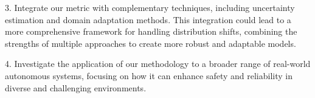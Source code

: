 3. Integrate our metric with complementary techniques, including uncertainty estimation and domain adaptation methods. This integration could lead to a more comprehensive framework for handling distribution shifts, combining the strengths of multiple approaches to create more robust and adaptable models.

4. Investigate the application of our methodology to a broader range of real-world autonomous systems, focusing on how it can enhance safety and reliability in diverse and challenging environments.%







